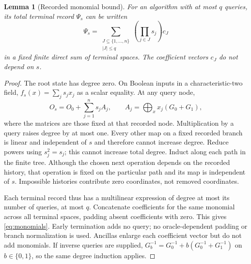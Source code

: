 \documentclass[11pt]{article}
\newtheorem{lemma}[theorem]{Lemma}
\begin{document}
\begin{lemma}[Recorded monomial bound]\label{lem:degree}
For an algorithm with at most $q$ queries, its total terminal record $\Psi_s$ can be written
\begin{equation}\label{eq:monomials}
 \Psi_s=\sum_{\substack{J\subseteq\{1,\ldots,n\}\\|J|\le q}}
       \left(\prod_{j\in J}s_j\right)c_J
\end{equation}
in a fixed finite direct sum of terminal spaces. The coefficient vectors $c_J$ do not depend on $s$.
\end{lemma}
\begin{proof}
The root state has degree zero. On Boolean inputs in a characteristic-two field, $f_s(x)=\sum_js_jx_j$ as a scalar equality. At any query node,
\[
 O_s=O_0+\sum_{j=1}^n s_j A_j,
 \qquad A_j=\bigoplus_x x_j(G_0+G_1),
\]
where the matrices are those fixed at that recorded node. Multiplication by a query raises degree by at most one. Every other map on a fixed recorded branch is linear and independent of $s$ and therefore cannot increase degree. Reduce powers using $s_j^2=s_j$; this cannot increase total degree. Induct along each path in the finite tree. Although the chosen next operation depends on the recorded history, that operation is fixed on the particular path and its map is independent of $s$. Impossible histories contribute zero coordinates, not removed coordinates.

Each terminal record thus has a multilinear expression of degree at most its number of queries, at most $q$. Concatenate coefficients for the same monomial across all terminal spaces, padding absent coefficients with zero. This gives \eqref{eq:monomials}. Early termination adds no query; no oracle-dependent padding or branch normalization is used. Ancillas enlarge each coefficient vector but do not add monomials. If inverse queries are supplied, $G_b^{-1}=G_0^{-1}+b(G_0^{-1}+G_1^{-1})$ on $b\in\{0,1\}$, so the same degree induction applies.
\end{proof}
\end{document}
